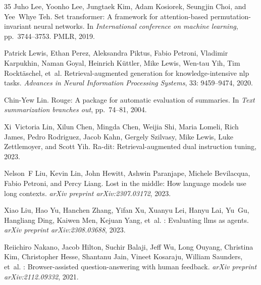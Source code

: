 \documentclass[UTF8,fontset=fandol,a4paper,11pt]{ctexart}
\begin{document}
\begin{thebibliography}{35}
Juho Lee, Yoonho Lee, Jungtaek Kim, Adam Kosiorek, Seungjin Choi, and Yee~Whye Teh.
\newblock Set transformer: A framework for attention-based permutation-invariant neural networks.
\newblock In \emph{International conference on machine learning}, pp.\  3744--3753. PMLR, 2019.

Patrick Lewis, Ethan Perez, Aleksandra Piktus, Fabio Petroni, Vladimir Karpukhin, Naman Goyal, Heinrich K{\"u}ttler, Mike Lewis, Wen-tau Yih, Tim Rockt{\"a}schel, et~al.
\newblock Retrieval-augmented generation for knowledge-intensive nlp tasks.
\newblock \emph{Advances in Neural Information Processing Systems}, 33: 9459--9474, 2020.

Chin-Yew Lin.
\newblock Rouge: A package for automatic evaluation of summaries.
\newblock In \emph{Text summarization branches out}, pp.\  74--81, 2004.

Xi~Victoria Lin, Xilun Chen, Mingda Chen, Weijia Shi, Maria Lomeli, Rich James, Pedro Rodriguez, Jacob Kahn, Gergely Szilvasy, Mike Lewis, Luke Zettlemoyer, and Scott Yih.
\newblock Ra-dit: Retrieval-augmented dual instruction tuning, 2023.

Nelson~F Liu, Kevin Lin, John Hewitt, Ashwin Paranjape, Michele Bevilacqua, Fabio Petroni, and Percy Liang.
\newblock Lost in the middle: How language models use long contexts.
\newblock \emph{arXiv preprint arXiv:2307.03172}, 2023{}.

Xiao Liu, Hao Yu, Hanchen Zhang, Yifan Xu, Xuanyu Lei, Hanyu Lai, Yu~Gu, Hangliang Ding, Kaiwen Men, Kejuan Yang, et~al.
: Evaluating llms as agents.
\newblock \emph{arXiv preprint arXiv:2308.03688}, 2023{}.

Reiichiro Nakano, Jacob Hilton, Suchir Balaji, Jeff Wu, Long Ouyang, Christina Kim, Christopher Hesse, Shantanu Jain, Vineet Kosaraju, William Saunders, et~al.
: Browser-assisted question-answering with human feedback.
\newblock \emph{arXiv preprint arXiv:2112.09332}, 2021.


\end{thebibliography}
\end{document}
